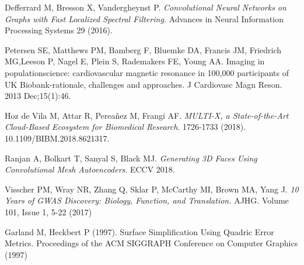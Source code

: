 \documentclass[twocolumn]{llncs}
\begin{document}
\begin{thebibliography}{8}
Defferrard M, Bresson X, Vandergheynst P. \textit{Convolutional Neural Networks on Graphs with Fast Localized Spectral Filtering.} Advances in Neural Information Processing Systems 29 (2016). 


Petersen SE, Matthews PM, Bamberg F, Bluemke DA, Francis JM, Friedrich MG,Leeson  P,  Nagel  E,  Plein  S,  Rademakers  FE,  Young  AA.  Imaging  in  populationscience: cardiovascular magnetic resonance in 100,000 participants of UK Biobank-rationale, challenges and approaches. J Cardiovasc Magn Reson. 2013 Dec;15(1):46.


Hoz de Vila M, Attar R, Perea\~nez M, Frangi AF. \textit{MULTI-X, a State-of-the-Art Cloud-Based Ecosystem for Biomedical Research}. 1726-1733 (2018). 10.1109/BIBM.2018.8621317.

Ranjan A, Bolkart T, Sanyal S, Black MJ. \textit{Generating 3D Faces Using Convolutional Mesh Autoencoders}. ECCV 2018.

Visscher PM, Wray NR, Zhang Q, Sklar P, McCarthy MI, Brown MA, Yang J. \textit{10 Years of GWAS Discovery: Biology, Function, and Translation.} AJHG. Volume 101, Issue 1, 5-22 (2017)

Garland M, Heckbert P (1997). Surface Simplification Using Quadric Error Metrics. Proceedings of the ACM SIGGRAPH Conference on Computer Graphics (1997)

\end{thebibliography}
\end{document}
